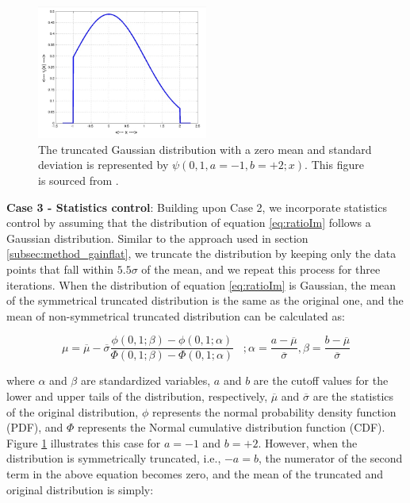 \begin{itemize}
    
    \begin{figure}[!htb]
        \centering
        \includegraphics[width=0.5\textwidth]{Figures/Truncated_Gaussian.jpg}
        \caption{The truncated Gaussian distribution with a zero mean and standard deviation is represented by $\psi(0,1,a = -1, b = +2; x)$. This figure is sourced from \cite{burkardt2014truncated}.}
        \label{fig:truncated_gaussian_dist}
    \end{figure}

    \textbf{Case 3 - Statistics control}: Building upon Case 2, we incorporate statistics control by assuming that the distribution of equation \ref{eq:ratioIm} follows a Gaussian distribution. Similar to the approach used in section \ref{subsec:method_gainflat}, we truncate the distribution by keeping only the data points that fall within $5.5 \sigma$ of the mean, and we repeat this process for three iterations. When the distribution of equation \ref{eq:ratioIm} is Gaussian, the mean of the symmetrical truncated distribution is the same as the original one, and the mean of non-symmetrical truncated distribution can be calculated as:
    
    \begin{equation}
        \mu = \overline{\mu} - \overline{\sigma} \frac{\phi (0,1; \beta) - \phi (0,1; \alpha)}{\Phi (0,1; \beta) - \Phi (0,1; \alpha)} \; \; \; ; \alpha = \frac{a-\overline{\mu}}{\overline{\sigma}} , \beta = \frac{b -\overline{\mu}}{\overline{\sigma}}
        \label{eq:truncated_dist}
    \end{equation}

    where $\alpha$ and $\beta$ are standardized variables, $a$ and $b$ are the cutoff values for the lower and upper tails of the distribution, respectively, $\overline{\mu}$ and $\overline{\sigma}$ are the statistics of the original distribution, $\phi$ represents the normal probability density function (PDF), and $\Phi$ represents the Normal cumulative distribution function (CDF). Figure \ref{fig:truncated_gaussian_dist} illustrates this case for $a=-1$ and $b=+2$. However, when the distribution is symmetrically truncated, i.e., $-a=b$, the numerator of the second term in the above equation becomes zero, and the mean of the truncated and original distribution is simply:
    

\end{itemize}
